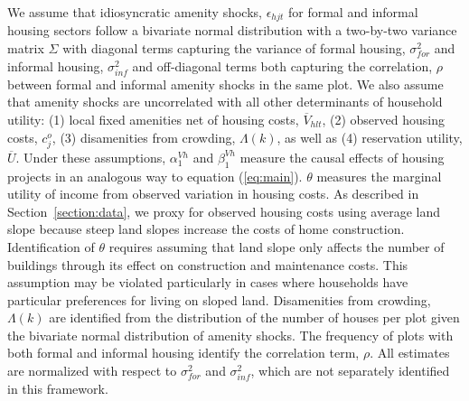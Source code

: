 \documentclass[12pt]{article}
\begin{document}
We assume that idiosyncratic amenity shocks, $\epsilon_{hjt}$ for formal and informal housing sectors follow a bivariate normal distribution with a two-by-two variance matrix $\Sigma$ with diagonal terms capturing the variance of formal housing, $\sigma_{for}^{2}$ and informal housing, $\sigma_{inf}^{2}$ and off-diagonal terms both capturing the correlation, $\rho$ between formal and informal amenity shocks in the same plot.  We also assume that amenity shocks are uncorrelated with all other determinants of household utility: (1) local fixed amenities net of housing costs, $\overline{V}_{hlt}$, (2) observed housing costs, $c^{o}_{j}$, (3) disamenities from crowding, $\Lambda(k)$, as well as (4) reservation utility, $\overline{U}$.   Under these assumptions, $\alpha^{Vh}_1$ and $\beta^{Vh}_1$ measure the causal effects of housing projects in an analogous way to equation (\ref{eq:main}).  $\theta$ measures the marginal utility of income from observed variation in housing costs.  As described in Section~\ref{section:data}, we proxy for observed housing costs using average land slope because steep land slopes increase the costs of home construction.  Identification of $\theta$ requires assuming that land slope only affects the number of buildings through its effect on construction and maintenance costs.  This assumption may be violated particularly in cases where households have particular preferences for living on sloped land.  Disamenities from crowding, $\Lambda(k)$ are identified from the distribution of the number of houses per plot given the bivariate normal distribution of amenity shocks.  The frequency of plots with both formal and informal housing identify the correlation term, $\rho$.  All estimates are normalized with respect to $\sigma_{for}^{2}$ and $\sigma_{inf}^{2}$, which are not separately identified in this framework.
\end{document}
